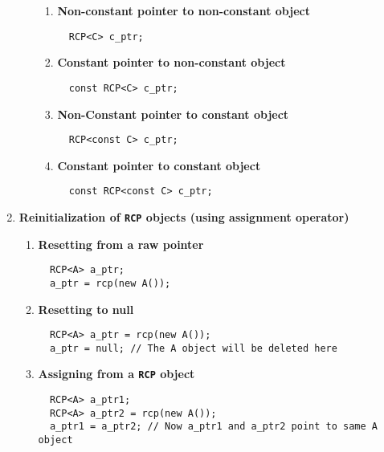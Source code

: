 \documentclass[pdf,ps2pdf,11pt]{SANDreport}
\begin{document}
\begin{enumerate}
\begin{enumerate}
\begin{enumerate}
%
\item {\bf Non-constant pointer to non-constant object }
{\small\begin{verbatim}
  RCP<C> c_ptr;
\end{verbatim}}
%
\item {\bf Constant pointer to non-constant object }
{\small\begin{verbatim}
  const RCP<C> c_ptr;
\end{verbatim}}
%
\item {\bf Non-Constant pointer to constant object }
{\small\begin{verbatim}
  RCP<const C> c_ptr;
\end{verbatim}}
%
\item {\bf Constant pointer to constant object}
{\small\begin{verbatim}
  const RCP<const C> c_ptr;
\end{verbatim}}
%
\end{enumerate}
%
\end{enumerate}

\item {\bf Reinitialization of \texttt{RCP} objects (using assignment operator)}
%
\begin{enumerate}
%
\item {\bf Resetting from a raw pointer}
%
{\small\begin{verbatim}
  RCP<A> a_ptr;
  a_ptr = rcp(new A());
\end{verbatim}}
%
\item {\bf Resetting to null}
%
{\small\begin{verbatim}
  RCP<A> a_ptr = rcp(new A());
  a_ptr = null; // The A object will be deleted here
\end{verbatim}}
%
\item {\bf Assigning from a \texttt{RCP} object}
%
{\small\begin{verbatim}
  RCP<A> a_ptr1;
  RCP<A> a_ptr2 = rcp(new A());
  a_ptr1 = a_ptr2; // Now a_ptr1 and a_ptr2 point to same A object
\end{verbatim}}
%
\end{enumerate}


\end{enumerate}
\end{document}
